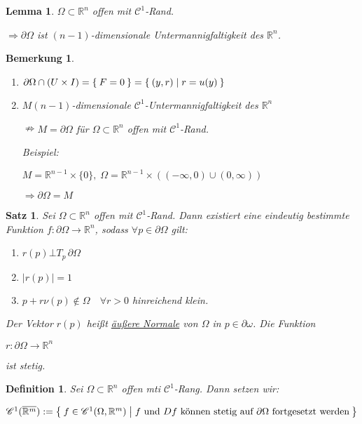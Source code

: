 \documentclass[11pt]{memoir}
\theoremstyle{changebreak}
\newtheorem{Definition}{Definition}[chapter]
\newtheorem{Bemerkung}{Bemerkung}[chapter]
\newtheorem{Lemma}{Lemma}[chapter]
\newtheorem{Satz}{Satz}[chapter]
\begin{document}
\begin{Lemma}
$\Omega \subset \mathbb R^n$ offen mit $\mathscr C^1$-Rand.
\begin{center}
	$\Rightarrow \partial \Omega$ ist $(n-1)$-dimensionale Untermannigfaltigkeit des $\mathbb R^n$.
\end{center}
\end{Lemma}


\begin{Bemerkung}
\begin{enumerate}
	\item $\partial \Omega \cap (U \times I) = \Set{F=0} = \Set{(y,r) | r = u(y)}$
	\item $M (n-1)$-dimensionale $\mathscr C^1$-Untermannigfaltigkeit des $\mathbb R^n$ 
	\par
	$\nRightarrow M = \partial \Omega$ für $\Omega \subset \mathbb R^n$ offen mit $\mathscr C^1$-Rand. 
	\par
	\emph{Beispiel}: 
	\par
	$M = \mathbb R^{n-1} \times \{0\}, \; \Omega = \mathbb R^{n-1} \times \left((-\infty, 0) \cup (0, \infty)\right)$
	\par
	$\Rightarrow \partial\Omega = M$
\end{enumerate}
\end{Bemerkung}

\begin{Satz}
Sei $\Omega \subset \mathbb R^n$ offen mit $\mathscr C^1$-Rand. Dann existiert eine eindeutig bestimmte Funktion $f: \partial\Omega \rightarrow \mathbb R^n$, sodass $\forall p \in \partial \Omega$ gilt:
\begin{enumerate}
	\item $r(p) \bot T_p \, \partial \Omega$
	\item $|r(p)| = 1$
	\item $p + r \nu(p) \notin \Omega \quad \forall r > 0$ hinreichend klein.
\end{enumerate}
Der Vektor $r(p)$ heißt \underline{äußere Normale} von $\Omega$ in $p \in \partial \omega$. Die Funktion 
\begin{center}
	$r: \partial \Omega \rightarrow \mathbb R^n$ 
\end{center}
ist stetig.
\end{Satz}


\begin{Definition}
Sei $\Omega \subset \mathbb R^n$ offen mti $\mathscr C^1$-Rang. Dann setzen wir:
\begin{center}
	$\mathscr C^1(\overline {\mathbb R^m}) := \Set{f \in \mathscr C^1(\Omega, \mathbb R^m) | f \text{ und }Df \text{ können stetig auf }\partial \Omega \text{ fortgesetzt werden}}$
\end{center}
\end{Definition}
\end{document}
